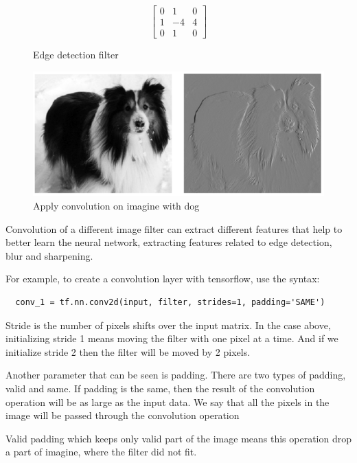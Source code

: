  \begin{figure}[htbp]
  $$\begin{bmatrix}
    0  & 1 & 0 \\
    1  & -4 & 4  \\
    0  & 1 & 0 
\end{bmatrix}$$
  \caption{Edge detection filter}
  \label{fig:edge-detection-filter}
\end{figure}
 \begin{figure}[htbp]
  \centerline{\includegraphics[scale=0.45]{fig/con-dog.PNG}}  
  \caption{Apply convolution on imagine with dog \cite{Mallat:2008:WTS:1525499}}
  \label{fig:exemple-dog-convolution}
\end{figure}
Convolution of a different image filter can extract different features that help to better learn the neural network,
 extracting features related to edge detection, blur and sharpening.

 For example, to create a convolution layer with tensorflow, use the syntax:

 \begin{lstlisting}
  conv_1 = tf.nn.conv2d(input, filter, strides=1, padding='SAME')
 \end{lstlisting}
 Stride is the number of pixels shifts over the input matrix.
 In the case above, initializing stride 1 means moving the filter with one pixel at a time.
 And if we initialize stride 2 then the filter will be moved by 2 pixels.

 Another parameter that can be seen is padding. There are two types of padding, valid and same.
 If padding is the same, then the result of the convolution operation will be as large as the input data.
 We say that all the pixels in the image will be passed through the convolution operation

 Valid padding which keeps only valid part of the image means 
 this operation drop a part of imagine, where the filter did not fit.

